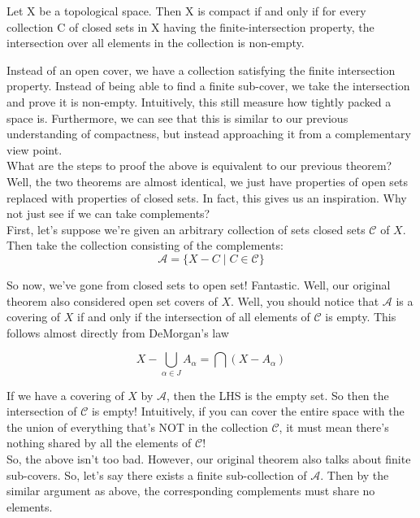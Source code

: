 \documentclass[english, 11pt]{article}
\begin{document}
  \begin{thrm}
  Let X be a topological space. Then X is compact if and only if for every collection C of closed sets in X having the finite-intersection property, the intersection over all elements in the collection is non-empty.
  \end{thrm}

  Instead of an open cover, we have a collection satisfying the finite intersection property. Instead of being able to find a finite sub-cover, we take the intersection and prove it is non-empty. Intuitively, this still measure how tightly packed a space is. Furthermore, we can see that this is similar to our previous understanding of compactness, but instead approaching it from a complementary view point. \\

  What are the steps to proof the above is equivalent to our previous theorem? Well, the two theorems are almost identical, we just have properties of open sets replaced with properties of closed sets. In fact, this gives us an inspiration. Why not just see if we can take complements?\\

  First, let's suppose we're given an arbitrary collection of sets closed sets $\mathcal{C}$ of $X$. Then take the collection consisting of the complements:
  $$
  \mathcal{A} = \{ X - C \mid C \in \mathcal{C}\}
  $$

  So now, we've gone from closed sets to open set! Fantastic. Well, our original theorem also considered open set covers of $X$. Well, you should notice that $\mathcal{A}$ is a covering of $X$ if and only if the intersection of all elements of $\mathcal{C}$ is empty. This follows almost directly from DeMorgan's law

  $$
  X - \bigcup_{\alpha \in J} A_{\alpha} = \bigcap (X - A_{\alpha})
  $$

  If we have a covering of $X$ by $\mathcal{A}$, then the LHS is the empty set. So then the intersection of $\mathcal{C}$ is empty! Intuitively, if you can cover the entire space with the the union of everything that's NOT in the collection $\mathcal{C}$, it must mean there's nothing shared by all the elements of $\mathcal{C}$!\\

  So, the above isn't too bad. However, our original theorem also talks about finite sub-covers. So, let's say there exists a finite sub-collection of $\mathcal{A}$. Then by the similar argument as above, the corresponding complements must share no elements.\\
\end{document}
